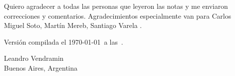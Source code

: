 Quiero agradecer a todas las personas que leyeron las notas y me enviaron 
correcciones y comentarios. Agradecimientos especialmente van para
Carlos Miguel Soto, 
Martín Mereb, 
Santiago Varela
.

\medskip
Versión compilada el \today~a las~\currenttime.

\begin{flushright} 
Leandro Vendramin\\Buenos Aires, Argentina\par
\end{flushright}
